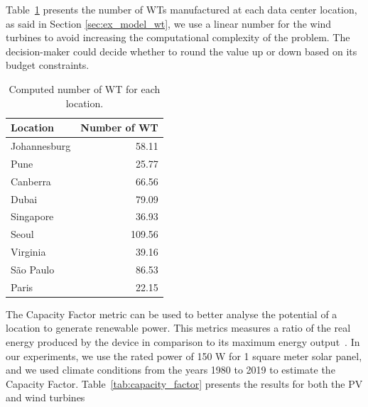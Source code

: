 Table~\ref{tab:results_wt} presents the number of WTs manufactured at each data center location, as said in Section \ref{sec:ex_model_wt}, we use a linear number for the wind turbines to avoid increasing the computational complexity of the problem. The decision-maker could decide whether to round the value up or down based on its budget constraints.


\begin{table}[h]
  \caption{Computed number of WT for each location.}\label{tab:results_wt} \centering
  \begin{tabular}{|l|r|}
  \hline
    
  \textbf{Location} &   \textbf{Number of WT} \\
  \hline
  Johannesburg & 58.11   \\
  \hline
  Pune  & 25.77 \\
  \hline
  Canberra  & 66.56 \\
  \hline
  Dubai   &  79.09  \\
  \hline
  Singapore & 36.93  \\
  \hline     
  Seoul    & 109.56  \\
  \hline
  Virginia   & 39.16 \\
  \hline
  São Paulo   & 86.53 \\
  \hline 
  Paris    &   22.15 \\
  \hline
  
\end{tabular}  
\end{table}

The Capacity Factor metric can be used to better analyse the potential of a location to generate renewable power. This metrics measures a ratio of the real energy produced by the device in comparison to its maximum energy output~\cite{NREL_2012_capacityfactor}. In our experiments, we use the rated power of 150 W for 1 square meter solar panel, and we used climate conditions from the years 1980 to 2019 to estimate the Capacity Factor. Table~\ref{tab:capacity_factor} presents the results for both the PV and wind turbines


